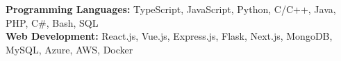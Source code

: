 \vspace{5pt}\item{
    \textbf{Programming Languages:} 
    TypeScript,
    JavaScript,
    Python,
    C/C++,
    Java,
    PHP,
    C\#,
    Bash,
    SQL \\
    
    \textbf{Web Development:} 
    React.js,
    Vue.js,
    Express.js,
    Flask,
    Next.js,
    MongoDB,
    MySQL,
    Azure,
    AWS,
    Docker
}
